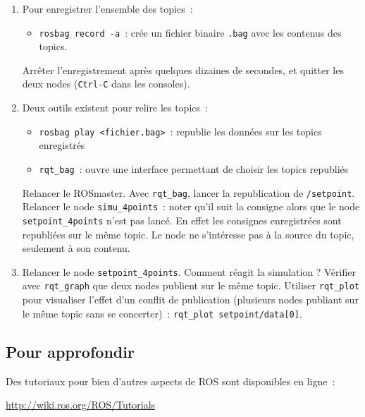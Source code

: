 \documentclass[12pt,a4paper]{article}
\begin{document}
\begin{enumerate}
\item Pour enregistrer l'ensemble des topics~: 
\begin{itemize}
\item \texttt{rosbag record -a}~: crée un fichier binaire \texttt{.bag} avec les contenus des topics.
\end{itemize}
Arrêter l'enregistrement après quelques dizaines de secondes, et quitter les deux nodes (\texttt{Ctrl-C} dans les consoles).
\item Deux outils existent pour relire les topics~:
\begin{itemize}
\item \texttt{rosbag play <fichier.bag>}~: republie les données sur les topics enregistrés
\item \texttt{rqt\_bag}~: ouvre une interface permettant de choisir les topics republiés
\end{itemize}
Relancer le ROSmaster. Avec \texttt{rqt\_bag}, lancer la republication de \texttt{/setpoint}.
Relancer le node \texttt{simu\_4points}~: noter qu'il suit la consigne alors que le node \texttt{setpoint\_4points} n'est pas lancé. En effet les consignes enregistrées sont republiées sur le même topic. Le node ne s'intéresse pas à la source du topic, seulement à son contenu. 

\item Relancer le node \texttt{setpoint\_4points}. Comment réagit la simulation ? 
Vérifier avec \linebreak \texttt{rqt\_graph} que deux nodes publient sur le même topic.
Utiliser \texttt{rqt\_plot} pour visualiser l'effet d'un conflit de publication (plusieurs nodes publiant sur le même topic sans se concerter)~: \texttt{rqt\_plot setpoint/data[0]}.
\end{enumerate}

\subsection*{Pour approfondir}

Des tutoriaux pour bien d'autres aspects de ROS sont disponibles en ligne~:

\begin{center}
\url{http://wiki.ros.org/ROS/Tutorials}
\end{center}



\newpage
\end{document}
